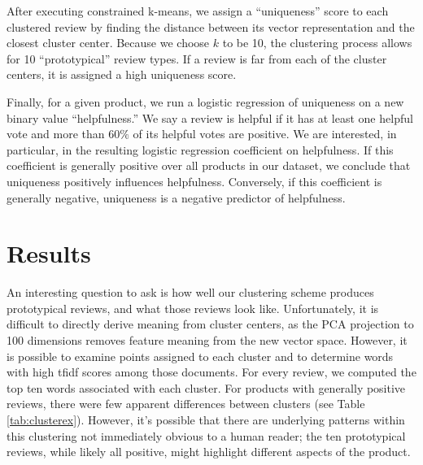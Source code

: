 \documentclass[10pt]{article}
\begin{document}
After executing constrained k-means, we assign a ``uniqueness'' score to each clustered review by finding the distance between its vector representation and the closest cluster center. Because we choose $k$ to be 10, the clustering process allows for 10 ``prototypical'' review types. If a review is far from each of the cluster centers, it is assigned a high uniqueness score.

Finally, for a given product, we run a logistic regression of uniqueness on a new binary value ``helpfulness.'' We say a review is helpful if it has at least one helpful vote and more than $60\%$ of its helpful votes are positive. We are interested, in particular, in the resulting logistic regression coefficient on helpfulness. If this coefficient is generally positive over all products in our dataset, we conclude that uniqueness positively influences helpfulness. Conversely, if this coefficient is generally negative, uniqueness is a negative predictor of helpfulness.

\section*{Results}
An interesting question to ask is how well our clustering scheme produces prototypical reviews, and what those reviews look like. Unfortunately, it is difficult to directly derive meaning from cluster centers, as the PCA projection to 100 dimensions removes feature meaning from the new vector space. However, it is possible to examine points assigned to each cluster and to determine words with high tfidf scores among those documents. For every review, we computed the top ten words associated with each cluster. For products with generally positive reviews, there were few apparent differences between clusters (see Table \ref{tab:clusterex}). However, it's possible that there are underlying patterns within this clustering not immediately obvious to a human reader; the ten prototypical reviews, while likely all positive, might highlight different aspects of the product.
\end{document}
